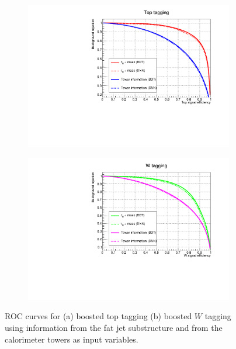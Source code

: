 \documentclass[main]{subfiles} %
\begin{document}
\begin{figure}[h]
     \centering
     \begin{subfigure}[h]{0.49\textwidth}
         \centering
         \includegraphics[width=\textwidth]{../Figures/Results/constituents/top_constituents.pdf}
          \caption{}
         \label{fig:top_constituents}
     \end{subfigure}
     \begin{subfigure}[h]{0.49\textwidth}
         \centering
         \includegraphics[width=\textwidth]{../Figures/Results/constituents/W_constituents.pdf}
          \caption{}
         \label{fig:W_constituents}
     \end{subfigure}
     \caption{ROC curves for (a) boosted top tagging (b) boosted $W$ tagging using information from the fat jet substructure and from the calorimeter towers as input variables.}
     \label{fig:ROC_constituents}
\end{figure}
\end{document}
